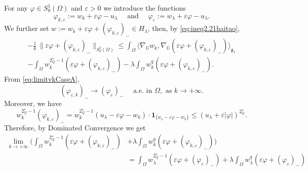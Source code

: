 \documentclass[11pt]{amsart}
\numberwithin{equation}{section} %
\theoremstyle{definition}
\def\G{\mathbb{G}}
\begin{document}
For any $\varphi\in S^1_0(\Omega)$ and $\varepsilon>0$ we introduce the functions
$$\varphi_{k,\varepsilon}:=w_k+\varepsilon\varphi-u_\lambda \quad \textrm{ and } \quad 
\varphi_{\varepsilon}:=w_\lambda+\varepsilon\varphi-u_\lambda.$$
We further set $w:=w_k+\varepsilon\varphi+(\varphi_{k,\varepsilon})_-\in H_\lambda$, 
then, by \eqref{eq:ineq2.21haitao},
\begin{multline}\label{eq:ineq2.22haitao}
-\frac{1}{k}\, \|\varepsilon\varphi+(\varphi_{k,\varepsilon})_-\|_{S^1_0(\Omega)}\leq \int_\Omega\langle \nabla_\G w_k,\nabla_\G(\varepsilon\varphi+(\varphi_{k,\varepsilon})_-)\rangle_{\mathfrak{g}_{1}}\\
-\int_\Omega w_k^{2^\star_Q-1}(\varepsilon\varphi+(\varphi_{k,\varepsilon})_-)
-\lambda\int_\Omega w_k^{q}(\varepsilon\varphi+(\varphi_{k,\varepsilon})_-).
\end{multline}
From \eqref{eq:limitvkCaseA},
$$(\varphi_{\varepsilon,k})_-\to(\varphi_\varepsilon)_-  \quad \textrm{ a.e. in } \Omega, \textrm{ as } k\to+\infty.$$
Moreover, we have
\[
w_k^{2^\star_Q-1}(\varphi_{k,\varepsilon})_-=w_k^{2^\star_Q-1}(u_\lambda-\varepsilon\varphi-w_k)\cdot \mathbf{1}_{\{u_\lambda-\varepsilon\varphi-w_k\}}
\leq (u_\lambda+\varepsilon|\varphi|)^{2^\star_Q}.
\]
Therefore, by Dominated Convergence we get
\begin{equation}\label{eq:gather1}
	\begin{split}
	\lim_{k\to+\infty}\biggl(\int_\Omega w_k^{2^\star_Q-1}(\varepsilon\varphi+(\varphi_{k,\varepsilon})_-)
	&+\lambda\int_\Omega w_k^{q}(\varepsilon\varphi+(\varphi_{k,\varepsilon})_-)\biggl)\\
	&=\int_\Omega w_\lambda^{2^\star_Q-1}(\varepsilon\varphi+(\varphi_\varepsilon)_-)+
	\lambda\int_\Omega w_\lambda^{q}(\varepsilon\varphi+(\varphi_\varepsilon)_-)
	\end{split}
\end{equation}
\end{document}
